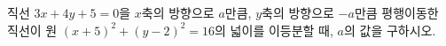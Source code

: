 직선 $3x+4y+5=0$을 $x$축의 방향으로 $a$만큼, $y$축의 방향으로 $-a$만큼 평행이동한 직선이 원 $(x+5)^2+(y-2)^2=16$의 넓이를 이등분할 때, $a$의 값을 구하시오.
